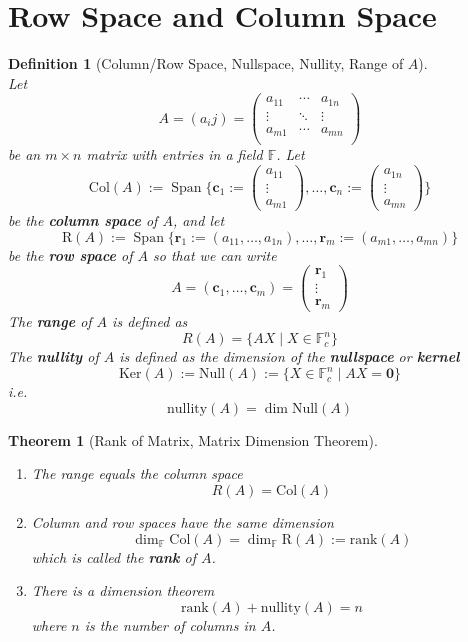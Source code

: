 \documentclass[12pt]{article}
\newcommand{\col}{\mathrm{Col}}
\newcommand{\row}{\mathrm{R}}
\newcommand{\kerne}{\mathrm{Ker}}
\newcommand{\nul}{\mathrm{Null}}
\newcommand{\nullity}{\mathrm{nullity}}
\newcommand{\rank}{\mathrm{rank}}
\newtheorem{definition}{Definition}[section]
\newtheorem{theorem}{Theorem}[section]
\theoremstyle{definition}
\DeclareMathOperator{\spn}{Span}
\begin{document}
\section{Row Space and Column Space}
\begin{definition}[Column/Row Space, Nullspace, Nullity, Range of $A$]
\hfill\\\normalfont
Let
\[
A=(a_ij)=\begin{pmatrix}
a_{11}&\cdots&a_{1n}\\
\vdots&\ddots&\vdots\\
a_{m1}&\cdots&a_{mn}\\
\end{pmatrix}
\]
be an $m\times n$ matrix with entries in a field $\mathbb{F}$. Let
\[
\col(A):=\spn\{\mathbf{c}_1:=\begin{pmatrix}a_{11}\\\vdots\\a_{m1}\end{pmatrix},\ldots,\mathbf{c}_n:=\begin{pmatrix}a_{1n}\\\vdots\\a_{mn}\end{pmatrix}\}
\]
be the \textbf{column space} of $A$, and let
\[
\row(A):=\spn\{\mathbf{r}_1:=(a_{11},\ldots,a_{1n}),\ldots,\mathbf{r}_m:=(a_{m1},\ldots,a_{mn})\}
\]
be the \textbf{row space} of $A$ so that we can write
\[
A=(\mathbf{c}_1,\ldots,\mathbf{c}_m)=\begin{pmatrix}\mathbf{r}_1\\\vdots\\\mathbf{r}_m\end{pmatrix}
\]
The \textbf{range} of $A$ is defined as
\[
R(A)=\{AX\mid X\in\mathbb{F}_c^n\}
\]
The \textbf{nullity} of $A$ is defined as the dimension of the \textbf{nullspace} or \textbf{kernel}
\[
  \kerne(A):=\nul(A):=\{X\in\mathbb{F}_c^n\mid AX=\mathbf{0}\}
\]
i.e. 
\[
\nullity(A)=\dim\nul(A)
\]
\end{definition}
\begin{theorem}[Rank of Matrix, Matrix Dimension Theorem]
\hfill\\\normalfont
\begin{enumerate}[label=(\arabic*)]
\item The range equals the column space
\[
R(A)=\col(A)
\]
\item Column and row spaces have the same dimension
\[
\dim_\mathbb{F}\col(A)=\dim_\mathbb{F}\row(A):=\rank(A)
\]
which is called the \textbf{rank} of $A$.
\item There is a dimension theorem
\[
\rank(A)+\nullity(A)=n
\]
where $n$ is the number of columns in $A$.
\end{enumerate}
\end{theorem}
\end{document}
